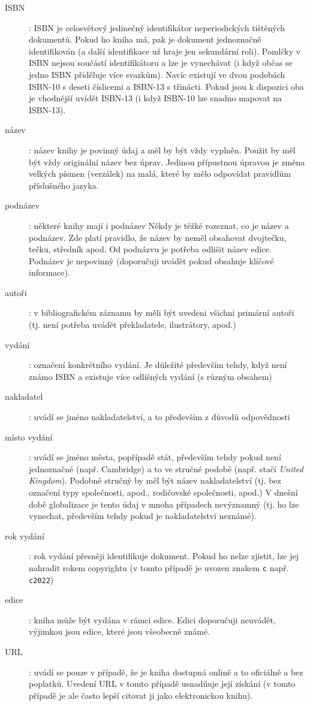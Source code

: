 \documentclass[male,czech,api_bc]{kitheses}
\begin{document}
\begin{description}
\item[ISBN]: ISBN je celosvětový jedinečný identifikátor neperiodických tištěných dokumentů. Pokud ho kniha má, pak je dokument jednoznačně identifikován (a další identifikace už hraje jen sekundární roli). Pomlčky v ISBN nejsou součástí identifikátoru a lze je vynechávat (i když občas se jedno ISBN přiděluje více svazkům). Navíc existují ve dvou podobách ISBN-10 s deseti číslicemi a ISBN-13 s třinácti. Pokud jsou k dispozici oba je vhodnější uvídět ISBN-13 (i když ISBN-10 lze snadno mapovat na ISBN-13).
\item[název]: název knihy je povinný údaj a měl by být vždy vyplněn. Použit by měl být vždy originální název bez úprav. Jedinou přípustnou úpravou je změna velkých písmen (verzálek) na malá, které by mělo odpovídat pravidlům příslušného jazyka.
\item[podnázev]: některé knihy mají i podnázev Někdy je těžké rozeznat, co je název a podnázev. Zde platí pravidlo, že název by neměl obsahovat dvojtečku, tečku, středník apod. Od podnázvu je potřeba odlišit název edice. Podnázev je nepovinný (doporučuji uvádět pokud obsahuje klíčové informace).
\item[autoři]: v bibliografickém záznamu by měli být uvedeni všichni primární autoři (tj. není potřeba uvádět překladatele, ilustrátory, apod.)
\item[vydání]: označení konkrétního vydání. Je důležité především tehdy, když není známo ISBN a existuje více odlišných vydání (s různým obsahem)
\item[nakladatel]: uvádí se jméno nakladatelství, a to především z důvodů odpovědnosti
\item[místo vydání]: uvádí se jméno města, popřípadě stát, především tehdy pokud není jednoznačné (např. Cambridge) a to ve stručné podobě (např. stačí \textit{United Kingdom}).  Podobně stručný by měl být název nakladatelství (tj. bez označení typy společnosti, apod., rodičovské společnosti, apod.)
V dnešní době globalizace je tento údaj v mnoha případech nevýznamný (tj. ho lze vynechat, především tehdy pokud je nakladatelství neznámé).
\item[rok vydání]: rok vydání přesněji identifikuje dokument. Pokud ho nelze zjistit, lze jej nahradit rokem copyrightu (v tomto případě je uvozen znakem \verb!c! např. \verb!c2022!)
\item[edice]: kniha může být vydána v rámci edice. Edici doporučuji neuvádět, výjimkou jsou edice, které jsou všeobecně známé.
\item[URL]: uvádí se pouze v případě, že je kniha dostupná onlině a to oficiálně a bez poplatků. Uvedení URL v tomto případě usnadňuje její získání (v tomto případě je ale často lepší citovat ji jako elektronickou knihu).
\end{description}
\end{document}
